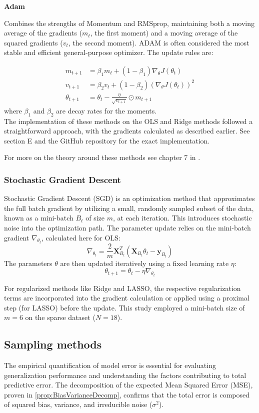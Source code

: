 \documentclass[twocolumn,aps]{revtex4}
\begin{document}
\textbf{Adam}

Combines the strengths of Momentum and RMSprop, maintaining both a moving average of the gradients ($m_t$, the first moment) and a moving average of the squared gradients ($v_t$, the second moment). 
ADAM is often considered the most stable and efficient general-purpose optimizer. 
The update rules are:

\begin{align*}
m_{t+1} &= \beta_1 m_t + (1 - \beta_1) \nabla_{\theta} J(\theta_t) \\
v_{t+1} &= \beta_2 v_t + (1 - \beta_2) (\nabla_{\theta} J(\theta_t))^2 \\
\theta_{t+1} &= \theta_t - \frac{\eta}{\sqrt{v_{t+1}}} \odot m_{t+1}
\end{align*}
where $\beta_1$ and $\beta_2$ are decay rates for the moments.
\\

The implementation of these methods on the OLS and Ridge methods followed a straightforward approach, with the gradients calculated as described earlier.
See section E and the GitHub repository \cite{rep} for the exact implementation.

For more on the theory around these methods see chapter 7 in \cite{compfys}.
\subsubsection{Stochastic Gradient Descent}
Stochastic Gradient Descent (SGD) is an optimization method that approximates the full batch gradient by utilizing a small, randomly sampled subset of the data, known as a mini-batch $B_t$ of size $m$, at each iteration. This introduces stochastic noise into the optimization path. 
The parameter update relies on the mini-batch gradient $\nabla_{\theta_t}$, calculated here for OLS:
$$\nabla_{\theta_{t}}=\frac{2}{m}\mathbf{X}_{B_{t}}^{T}(\mathbf{X}_{B_{t}}\theta_{t}-\mathbf{y}_{B_{t}})$$
The parameters $\theta$ are then updated iteratively using a fixed learning rate $\eta$:
$$\theta_{t+1}=\theta_{t}-\eta\nabla_{\theta_{t}}$$

For regularized methods like Ridge and LASSO, the respective regularization terms are incorporated into the gradient calculation or applied using a proximal step (for LASSO) before the update. This study employed a mini-batch size of $m=6$ on the sparse dataset ($N=18$).

\subsection{Sampling methods}
The empirical quantification of model error is essential for evaluating generalization performance and understanding the factors contributing to total predictive error. The decomposition of the expected Mean Squared Error (MSE), proven in \ref{prop:BiasVarianceDecomp}, confirms that the total error is composed of squared bias, variance, and irreducible noise ($\sigma^2$).
\end{document}

